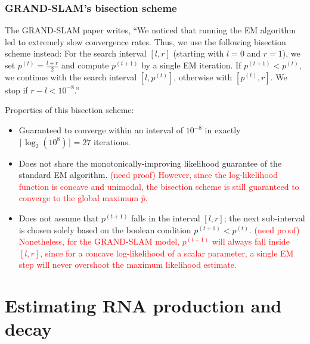 \documentclass[11pt]{article}
\begin{document}
\subsubsection{GRAND-SLAM's bisection scheme}

The GRAND-SLAM paper writes, ``We noticed that running the EM algorithm led to extremely slow convergence rates. Thus, we use the following bisection scheme instead: For the search interval $[l,r]$ (starting with $l=0$ and $r=1$), we set $p^{(t)} = \frac{l+r}{2}$ and compute $p^{(t+1)}$ by a single EM iteration. If $p^{(t+1)} < p^{(t)}$, we continue with the search interval $[l, p^{(t)}]$, otherwise with $[p^{(t)}, r]$. We stop if $r-l < 10^{-8}$.''

Properties of this bisection scheme:\begin{itemize}
\item Guaranteed to converge within an interval of $10^{-8}$ in exactly $\lceil \log_2(10^8) \rceil = 27$ iterations.
\item Does not share the monotonically-improving likelihood guarantee of the standard EM algorithm. \textcolor{red}{(need proof) However, since the log-likelihood function is concave and unimodal, the bisection scheme is still guaranteed to converge to the global maximum $\hat{p}$.}
\item Does not assume that $p^{(t+1)}$ falls in the interval $[l, r]$; the next sub-interval is chosen solely based on the boolean condition $p^{(t+1)} < p^{(t)}$. \textcolor{red}{(need proof) Nonetheless, for the GRAND-SLAM model, $p^{(t+1)}$ will always fall inside $[l, r]$, since for a concave log-likelihood of a scalar parameter, a single EM step will never overshoot the maximum likelihood estimate.}
\end{itemize}

\section{Estimating RNA production and decay}
\end{document}
